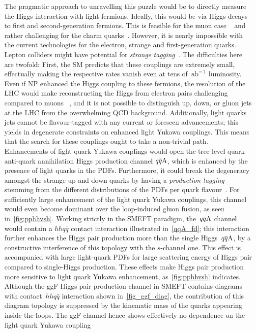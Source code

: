 The pragmatic approach to unravelling this puzzle would be to directly measure the Higgs interaction with light fermions. Ideally, this would be via Higgs decays to first and second-generation fermions. This is feasible for the muon case ~\cite{ATLAS:2020fzp,CMS:2020xwi} and rather challenging for the charm quarks~\cite{ATLAS-CONF-2021-021,ATLAS:2022ers,CMS:2019hve}. However, it is  nearly impossible with the current technologies for the electron, strange and first-generation quarks. Lepton colliders might have potential for \emph{strange tagging}~\cite{Nakai:2020kuu}. The difficulties here are twofold: First, the SM predicts that these couplings are extremely small, effectually making the respective rates vanish even at tens of~$\invab$ luminosity. Even if NP enhanced the Higgs coupling to these fermions, the resolution of the LHC would make reconstructing the Higgs from electron pairs challenging compared to muons ~\cite{Khachatryan:2014aep}, and it is not possible to distinguish up, down, or gluon jets at the LHC from the overwhelming QCD background. Additionally, light quarks jets cannot be flavour-tagged with any current or foreseen advancements; this yields in degenerate constraints on enhanced light Yukawa couplings.  This means that the search for these couplings ought to take a non-trivial path. Enhancements of light quark Yukawa couplings would open the tree-level quark anti-quark annihilation Higgs production channel $q\overline q \rm A$, which is enhanced by the presence of light quarks in the PDFs. Furthermore, it could break the degeneracy amongst the strange up and down quarks by having a \emph{production tagging} stemming from the different distributions of the PDFs per quark flavour~\cite{Soreq:2016rae}.  For sufficiently large enhancement of the light quark Yukawa couplings, this channel would even become dominant over the loop-induced gluon fusion, as seen in~\autoref{fig:pphhvsh}. Working strictly in the  SMEFT paradigm, the~$q\overline q \rm A$ channel would contain a $hhq\bar q$ contact interaction illustrated in~\autoref{qqA_fd}; this interaction further enhances the Higgs pair production more than the single Higgs~$q\overline q \rm A$, by a constructive interference of this topology with the $s$-channel one. This effect is accompanied with large light-quark PDFs for large scattering energy of Higgs pair compared to single-Higgs production. These effects  make Higgs pair production more sensitive to light quark Yukawa enhancement, as~\autoref{fig:pphhvsh} indicates. \\ Although the ggF Higgs pair production channel in SMEFT contains diagrams with contact~$hhq\bar q$  interaction shown in~\autoref{fig_ggf_diag}, the contribution of this diagram topology is suppressed by the kinematic mass of the quarks appearing inside the loops. The ggF channel hence shows effectively no dependence on the light quark Yukawa coupling \\
